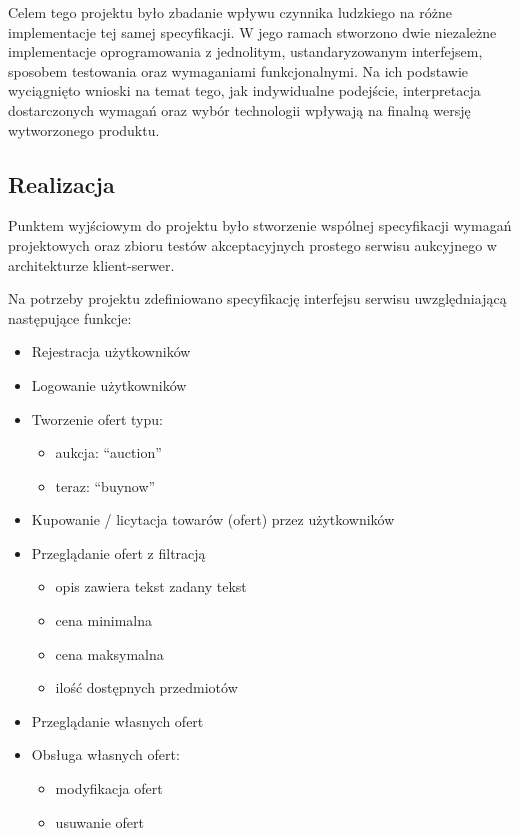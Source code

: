 \documentclass[12pt, notitlepage]{article}
\begin{document}
Celem tego projektu było zbadanie wpływu czynnika ludzkiego na różne implementacje tej samej specyfikacji. W jego ramach stworzono dwie niezależne implementacje oprogramowania z jednolitym, ustandaryzowanym interfejsem, sposobem testowania oraz wymaganiami funkcjonalnymi. Na ich podstawie wyciągnięto wnioski na temat tego, jak indywidualne podejście, interpretacja dostarczonych wymagań oraz wybór technologii wpływają na finalną wersję wytworzonego produktu.

\subsection{Realizacja}

Punktem wyjściowym do projektu było stworzenie wspólnej specyfikacji wymagań projektowych oraz zbioru testów akceptacyjnych \cite{tests} prostego serwisu aukcyjnego w architekturze klient-serwer.

Na potrzeby projektu zdefiniowano specyfikację interfejsu serwisu uwzględniającą następujące funkcje:
\begin{itemize}
    \item Rejestracja użytkowników
	\item Logowanie użytkowników
	\item Tworzenie ofert typu:
    \begin{itemize}
		\item aukcja: ``auction''
		\item teraz: ``buynow''
    \end{itemize}
	\item Kupowanie / licytacja towarów (ofert) przez użytkowników
    \item Przeglądanie ofert z filtracją
    \begin{itemize}
        \item opis zawiera tekst zadany tekst
        \item cena minimalna
        \item cena maksymalna
        \item ilość dostępnych przedmiotów
    \end{itemize}
	\item Przeglądanie własnych ofert
    \item Obsługa własnych ofert:
    \begin{itemize}
		\item modyfikacja ofert
        \item usuwanie ofert
    \end{itemize}
\end{itemize}
\end{document}
